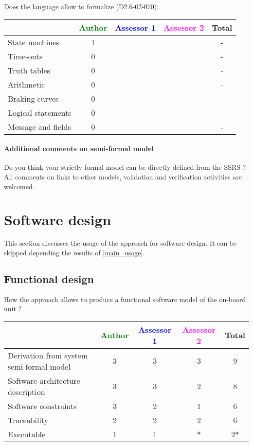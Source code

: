 Does the language allow to formalize (D2.6-02-070):

\begin{tabular}{|l | c | c | c | c|}
\hline
& \textcolor{green}{Author} & \textcolor{blue}{Assessor 1} & \textcolor{magenta}{Assessor 2} & Total \\
\hline
State machines & 1 & & & - \\
\hline
Time-outs & 0 &  & & - \\
\hline
Truth tables & 0 & & & - \\
\hline
Arithmetic & 0 & & & - \\
\hline
Braking curves & 0 & & & - \\
\hline
Logical statements & 0 & & & - \\
\hline
Message and fields & 0 & & & - \\
\hline
\end{tabular}

\paragraph{Additional comments on semi-formal model} Do you think your strictly formal model can be directly defined from the SSRS ?
All comments on links to other models, validation and verification activities are welcomed.

\section{Software design}
This section discusses the usage of the approach for software design.
It can be skipped depending the results of \ref{main_usage}.

\subsection{Functional design}

How the approach allows to produce a functional software model of the on-board unit ?

\begin{tabular}{|l | c | c | c | c|}
\hline
& \textcolor{green}{Author} & \textcolor{blue}{Assessor 1} & \textcolor{magenta}{Assessor 2} & Total \\
\hline
Derivation from system semi-formal model & 3 & 3 & 3 & 9 \\
\hline
Software architecture description & 3 & 3 & 2 & 8 \\
\hline
Software constraints & 3 & 2 & 1 & 6 \\
\hline
Traceability & 2 & 2 & 2 & 6 \\
\hline
Executable & 1 & 1 & * & 2* \\
\hline
\end{tabular}



